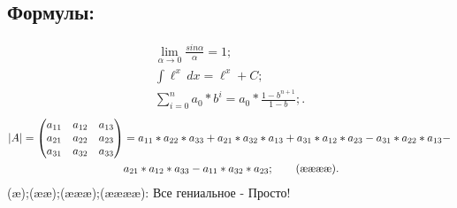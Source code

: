 \documentclass[12pt, a4paper]{article}
\begin{document}
\subsection{Формулы:}
\begin{align}
 \lim_{\alpha \to 0}
    \frac{sin\alpha}{\alpha}
    =1; \tag{\ae}\label{aster} \\    
    \int {\ell^x}\, dx
    ={\ell^x}+C;\tag{\ae\ae}\label{aster} \\
    \sum_{i=0}^n a_0*b^i
    =a_0*{\frac{1-b^{n+1}}{1-b}};\tag{\ae\ae\ae}\label{aster}.
    \end{align}
    \begin{align}
   |A|= 
   \begin{pmatrix}
        a_{11} & a_{12} & a_{13} \\
        a_{21} & a_{22} & a_{23}\\
        a_{31} & a_{32}  & a_{33}
    \end{pmatrix}
    &=a_{11}*a_{22}*a_{33}+a_{21}*a_{32}*a_{13}+
    a_{31}*a_{12}*a_{23}-a_{31}*a_{22}*a_{13}-\notag\\
   & a_{21}*a_{12}*a_{33}-a_{11}*a_{32}*a_{23};
    \tag{\ae\ae\ae\ae}\label{aster}.
\end{align}
(\ae);(\ae\ae);(\ae\ae\ae);(\ae\ae\ae\ae): Все гениальное - Просто!
\end{document}
